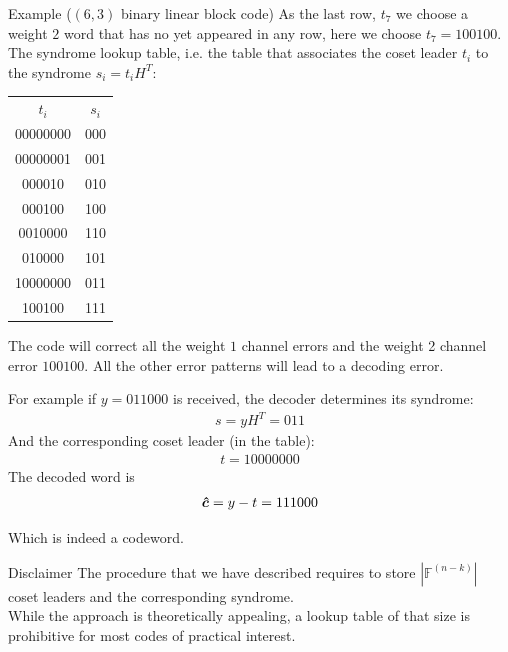 \begin{parag}{Example ($\left(6, 3\right)$ binary linear block code) }
    As the last row, $t_7$ we choose a weight $2$ word that has no yet appeared in any row, here we choose $t_7 = 100100$.\\
The syndrome lookup table, i.e. the table that associates the coset leader $t_i$ to the syndrome $s_i =  t_iH^T$:
\begin{center} \begin{tabular}{cc}$t_i$ & $s_i$ \\ 00000000 & 000 \\ 00000001 & 001 \\ 000010 & 010 \\ 000100 & 100 \\ 0010000 & 110 \\ 010000 & 101 \\ 10000000 & 011 \\ 100100 & 111 \end{tabular} \end{center} 
The code will correct all the weight $1$ channel errors and the weight 2 channel error $100100$. All the other error patterns will lead to a decoding error.
\begin{subparag}{For example}
    if $y = 011000$ is received, the decoder determines its syndrome:
    \begin{align*} 
        s = yH^T =  011
    \end{align*}
    And the corresponding coset leader (in the table): 
    \begin{align*} t = 10000000 \end{align*}
    The decoded word is
    \begin{align*} \bm{\hat{c}} =  y - t =  111000 \end{align*}

    Which is indeed a codeword.
\end{subparag}

\begin{subparag}{Disclaimer}
    The procedure that we have described requires to store $\left|\mathbb{F}^{\left(n-k\right)}\right|$ coset leaders and the corresponding syndrome.\\
    While the approach is theoretically appealing,  a lookup table of that size is prohibitive for most codes of practical interest.
    
\end{subparag}


\end{parag}



